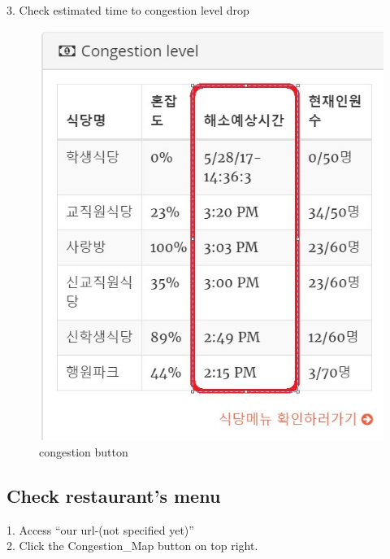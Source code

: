 \documentclass[journal]{IEEEtran}
\begin{document}
3. Check estimated time to congestion level drop\\
\newline\newline\newline\newline\newline\newline\newline
\newline
\newline
\newline
\begin{figure}[h]
\centering
\includegraphics[scale=0.4]{C.jpg}
\caption{congestion button}
\label{fig:Main page}
\end{figure}

\newline
\subsection{Check restaurant's menu}
1. Access “our url-(not specified yet)” \\
2. Click the Congestion\_Map button on top right.\\
\end{document}
